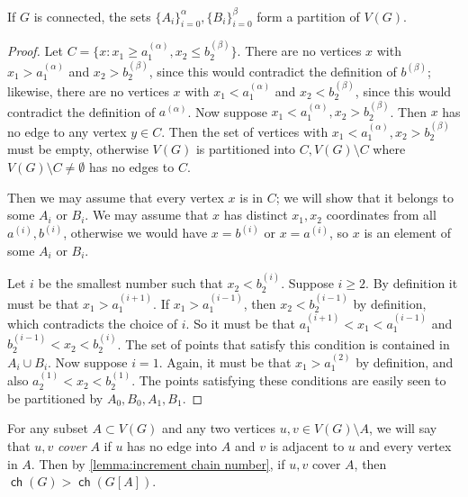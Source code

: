 \documentclass{article}
\DeclareMathOperator\ch{\mathsf{ch}}
\begin{document}
\begin{proposition}
	\label{prop:permutation partition}
	If $G$ is connected, the sets $\{A_i\}_{i=0}^{\alpha}, \{B_i\}_{i=0}^{\beta}$ form a partition of
	$V(G)$.
\end{proposition}
\begin{proof}
	Let $C = \{ x : x_1 \geq a^{(\alpha)}_1, x_2 \leq b^{(\beta)}_2 \}$.  There are no vertices $x$ with
	$x_1 > a^{(\alpha)}_1$ and $x_2 > b^{(\beta)}_2$, since this would contradict the definition of
	$b^{(\beta)}$; likewise, there are no vertices $x$ with $x_1 < a^{(\alpha)}_1$ and $x_2 <
	b^{(\beta)}_2$, since this would contradict the definition of $a^{(\alpha)}$.  Now suppose $x_1 <
	a^{(\alpha)}_1, x_2 > b^{(\beta)}_2$. Then $x$ has no edge to any vertex $y \in C$. Then the set of
	vertices with $x_1 < a^{(\alpha)}_1, x_2 > b^{(\beta)}_2$ must be empty, otherwise $V(G)$ is
	partitioned into $C, V(G) \setminus C$ where $V(G) \setminus C \neq \emptyset$ has no edges to $C$.
	
	Then we may assume that every vertex $x$ is in $C$; we will show that it belongs to some $A_i$ or
	$B_i$.  We may assume that $x$ has distinct $x_1,x_2$ coordinates from all $a^{(i)}, b^{(i)}$,
	otherwise we would have $x = b^{(i)}$ or $x = a^{(i)}$, so $x$ is an element of some $A_i$ or $B_i$.
	
	Let $i$ be the smallest number such that $x_2 < b^{(i)}_2$. Suppose $i \geq 2$. By definition it
	must be that $x_1 > a^{(i+1)}_1$. If $x_1 > a^{(i-1)}_1$, then $x_2 < b^{(i-1)}_2$ by definition,
	which contradicts the choice of $i$. So it must be that $a^{(i+1)}_1 < x_1 < a^{(i-1)}_1$ and
	$b^{(i-1)}_2 < x_2 < b^{(i)}_2$. The set of points that satisfy this condition is contained in $A_i
	\cup B_i$. Now suppose $i=1$. Again, it must be that $x_1 > a^{(2)}_1$ by definition, and also
	$a^{(1)}_2 < x_2 < b^{(1)}_2$. The points satisfying these conditions are easily seen to be
	partitioned by $A_0, B_0, A_1, B_1$.
\end{proof}

For any subset $A \subset V(G)$ and any two vertices $u,v \in V(G) \setminus A$, we will say that
$u,v$ \emph{cover} $A$ if $u$ has no edge into $A$ and $v$ is adjacent to $u$ and every vertex in
$A$. Then by \cref{lemma:increment chain number}, if $u,v$ cover $A$, then $\ch(G) > \ch(G[A])$.
\end{document}
